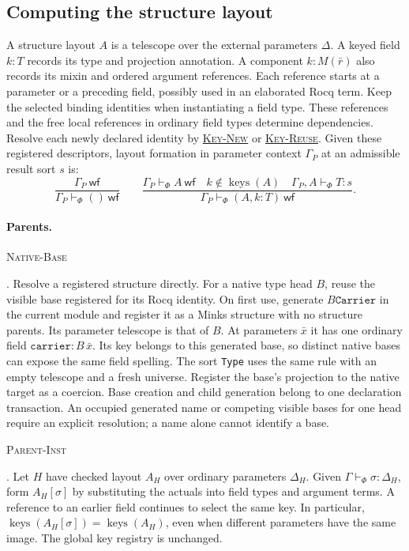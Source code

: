 \documentclass{article}
\newcommand{\ttt}[1]{\texttt{#1}}
\newcommand{\keys}{\operatorname{keys}}
\newcommand{\wf}{\mathsf{wf}}
\newcommand{\rdefn}[1]{\hypertarget{rule-#1}{\textsc{#1}}}
\newcommand{\ruse}[1]{\hyperlink{rule-#1}{\textsc{#1}}}
\begin{document}
\subsection{Computing the structure layout}

A structure layout $A$ is a telescope over the external parameters $\Delta$. A keyed
field $k:T$ records its type and projection annotation. A component
$k:M(\bar r)$ also records its mixin and ordered argument references.
Each reference starts at a parameter or a preceding field, possibly
used in an elaborated Rocq term. Keep the selected binding identities
when instantiating a field type. These references and the
free local references in ordinary field types determine dependencies.
Resolve each newly declared identity by \ruse{Key-New} or
\ruse{Key-Reuse}. Given these registered descriptors, layout formation
in parameter context $\Gamma_P$ at an admissible result sort $s$ is:
\[
 \frac{\Gamma_P\ \wf}{\Gamma_P\vdash_\Phi ()\ \wf}
 \qquad
 \frac{\Gamma_P\vdash_\Phi A\ \wf\quad k\notin\keys(A)\quad
       \Gamma_P,A\vdash_\Phi T:s}
      {\Gamma_P\vdash_\Phi (A,k:T)\ \wf}.
\]

\paragraph{Parents.}
\rdefn{Native-Base}. Resolve a registered structure directly. For a
native type head $B$, reuse the visible base registered for its Rocq
identity. On first use, generate $B\ttt{Carrier}$ in the current module
and register it as a Minks structure with no structure parents. Its
parameter telescope is that of $B$. At parameters $\bar x$ it has one
ordinary field $\ttt{carrier}:B\,\bar x$. Its key belongs to this
generated base, so distinct native bases can expose the same field spelling. The sort \ttt{Type} uses
the same rule with an empty telescope and a fresh universe.
Register the base's projection to the native target as a coercion.
Base creation and child generation belong to one declaration transaction.
An occupied generated name or competing visible bases for one head
require an explicit resolution; a name alone cannot identify a base.

\rdefn{Parent-Inst}. Let $H$ have checked layout $A_H$ over ordinary
parameters $\Delta_H$. Given $\Gamma\vdash_\Phi\sigma:\Delta_H$, form
$A_H[\sigma]$ by substituting the actuals into field types and argument
terms. A reference to an earlier field continues to select the same key.
In particular, $\keys(A_H[\sigma])=\keys(A_H)$, even when different
parameters have the same image. The global key registry is unchanged.
\end{document}
